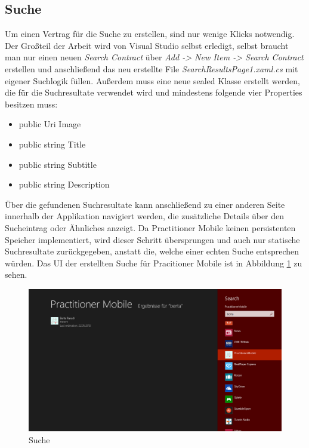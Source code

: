 \documentclass[a4paper,bibtotoc,oneside]{scrbook}
\begin{document}
\subsection{Suche}
Um einen Vertrag für die Suche zu erstellen, sind nur wenige Klicks notwendig. Der Großteil der Arbeit wird von Visual Studio selbst erledigt, selbst braucht man nur einen neuen \textit{Search Contract} über \textit{Add -> New Item -> Search Contract} erstellen und anschließend das neu erstellte File \textit{SearchResultsPage1.xaml.cs} mit eigener Suchlogik füllen. Außerdem muss eine neue sealed Klasse erstellt werden, die für die Suchresultate verwendet wird und mindestens folgende vier Properties besitzen muss:
\begin{itemize}
    \item public Uri Image
    \item public string Title
    \item public string Subtitle
    \item public string Description
\end{itemize}
Über die gefundenen Suchresultate kann anschließend zu einer anderen Seite innerhalb der Applikation navigiert werden, die zusätzliche Details über den Sucheintrag oder Ähnliches anzeigt.
\newline
Da Practitioner Mobile keinen persistenten Speicher implementiert, wird dieser Schritt übersprungen und auch nur statische Suchresultate zurückgegeben, anstatt die, welche einer echten Suche entsprechen würden.
\newline
\newline
Das UI der erstellten Suche für Pracitioner Mobile ist in Abbildung \ref{img:search} zu sehen.
\begin{figure}[htbp]
\centering
\includegraphics[scale=0.4]{images/search.png}
\caption[Suche]{Suche}\label{img:search}
\end{figure}
\newline
\end{document}
